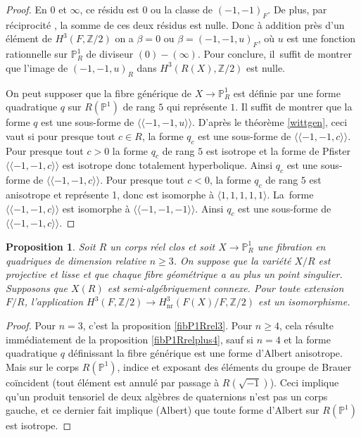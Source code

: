 \documentclass[JEP,XML,SOM,Unicode,francais,published]{cedram}
\newtheorem{prop}[thm]{Proposition}
\theoremstyle{definition}
\newcommand{\Z}{\mathbb Z}
\renewcommand{\P}{\mathbb P}
\newcommand{\on}[1]{\operatorname{#1}}
\begin{document}
\begin{proof}
En $0$ et $\infty$, ce résidu est $0$ ou la classe de $(-1,-1)_{F}$.
De plus, par réciprocité \cite[Prop.\,2.2]{rost1996chow}, la somme de ces deux résidus est nulle. Donc
à addition près d'un élément de $H^3(F,\Z/2)$ on a
$\beta=0$ ou $\beta=(-1,-1,u)_{F}$, où $u$ est une fonction rationnelle sur $\P^1_{R}$
de diviseur $(0)-(\infty)$. Pour conclure, il~suffit de montrer que l'image de $(-1,-1,u)_{R}$ dans $H^3(R(X), \Z/2)$ est nulle.

On peut supposer que la fibre générique de $X\to \P^1_R$ est définie par une forme quadratique $q$ sur $R(\P^1)$ de rang $5$ qui représente $1$.
Il suffit de montrer que la forme $q$ est une sous-forme de $\langle \!\langle -1,-1,u\rangle \!\rangle$.
D'après le théorème \ref{wittgen}, ceci vaut si pour presque tout $c\in R$,
la forme $q_{c}$ est une sous-forme de $\langle \!\langle -1,-1,c\rangle \!\rangle$.
Pour presque tout $c>0$ la forme $q_{c}$ de rang $5$ est isotrope et la forme de Pfister $\langle \!\langle-1,-1,c\rangle \!\rangle$ est isotrope donc
totalement hyperbolique. Ainsi $q_{c}$ est une sous-forme de $\langle \!\langle-1,-1,c\rangle \!\rangle$.
Pour presque tout $c<0$, la forme $q_{c}$ de rang $5$ est anisotrope et représente 1, donc
est isomorphe à $ \langle 1,1,1,1,1\rangle $. La~forme $\langle \!\langle-1,-1,c\rangle \!\rangle$ est isomorphe
à $\langle \!\langle-1,-1,-1\rangle \!\rangle$. Ainsi $q_{c}$ est une sous-forme de $\langle \!\langle-1,-1,c\rangle \!\rangle$.
\end{proof}

\begin{prop}\label{fibquaRconnexenqeq3}
Soit $R$ un corps réel clos et soit $X\to \P^1_{R}$ une fibration en quadriques de dimension relative $ n \geq 3$.
On suppose que la variété $X/R$ est projective et lisse
et que chaque fibre géométrique a au plus un point singulier.
Supposons que $X(R)$ est semi-algébriquement connexe.
Pour toute extension $F/R$, l'application $H^3(F,\Z/2) \to H^3_{\on{nr}}(F(X)/F, \Z/2)$ est
un isomorphisme.
\end{prop}
\begin{proof}
Pour $n=3$, c'est la proposition \ref{fibP1Rrel3}. Pour $n\geq 4$,
cela résulte immédiatement de la proposition \ref{fibP1Rrelplus4}, sauf si
$n=4$ et la forme quadratique $q$ définissant la fibre générique
est une forme d'Albert anisotrope. Mais sur le corps $R(\P^1)$,
indice et exposant des éléments du groupe de Brauer coïncident
(tout élément est annulé par passage à $R(\sqrt{-1})$). Ceci implique
qu'un produit tensoriel de deux algèbres de quaternions n'est pas un corps
gauche, et ce dernier fait implique (Albert) que toute forme d'Albert sur $R(\P^1)$ est isotrope.
\end{proof}
\end{document}
